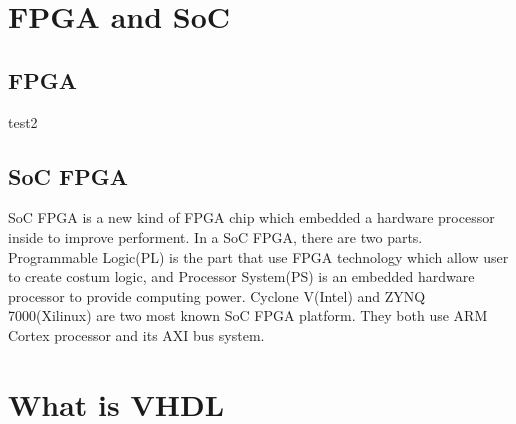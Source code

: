 \documentclass[12pt,article]{memoir}
\begin{document}
\section{FPGA and SoC}
\subsection{FPGA}
test2
\subsection{SoC FPGA}
SoC FPGA is a new kind of FPGA chip which embedded a hardware processor inside to improve performent. In a SoC FPGA, there are two parts. Programmable Logic(PL) is the part that use FPGA technology which allow user to create costum logic, and Processor System(PS) is an embedded hardware processor to provide computing power. Cyclone V(Intel) and ZYNQ 7000(Xilinux) are two most known SoC FPGA platform. They both use ARM Cortex processor and its AXI bus system.
\section{What is VHDL}
\end{document}
